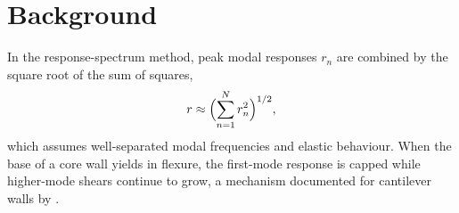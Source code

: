 \chapter{Background}
\label{ch:background}

In the response-spectrum method, peak modal responses $r_n$ are combined by the square root of
the sum of squares,
\begin{equation}
  r \approx \Bigl(\sum_{n=1}^{N} r_n^{2}\Bigr)^{1/2} ,
  \label{eq:srss}
\end{equation}
which assumes well-separated modal frequencies and elastic behaviour. When the base of a core
wall yields in flexure, the first-mode response is capped while higher-mode shears continue to
grow, a mechanism documented for cantilever walls by \citet{priestley2003}.
